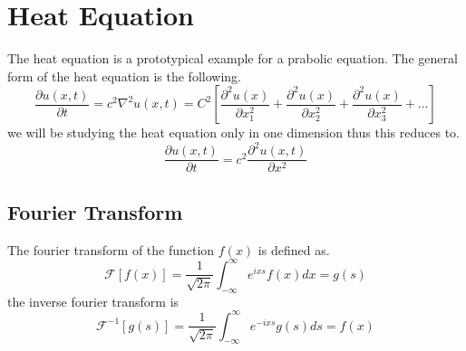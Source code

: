 \documentclass[]{article}
\begin{document}
\section{Heat Equation}
The heat equation is a prototypical example for a prabolic equation. The general form of the heat equation is the following.
\[
    \frac{\partial u(x,t)}{\partial t} = c^2\nabla^2 u(x,t) = C^2\left[\frac{\partial^2 u(x)}{\partial x^{2}_{1}} + \frac{\partial^2 u(x)}{\partial x^{2}_{2}} + \frac{\partial^2 u(x)}{\partial x^{2}_{3}} + \dots\right]    
\]
we will be studying the heat equation only in one dimension thus this reduces to.
\[
    \frac{\partial u(x,t)}{\partial t} = c^2 \frac{\partial^2 u(x,t)}{\partial x^2}     
\]


\subsection{Fourier Transform}

The fourier transform of the function $f(x)$ is defined as.
\[
    \mathscr{F}\left[f\left(x\right)\right]=\frac{1}{\sqrt{2\pi}}\int_{-\infty}^{\infty}e^{ixs}f\left(x\right)dx= g\left(s\right)    
\] 
the inverse fourier transform is 
\[
    \mathscr{F}^{-1}\left[g\left(s\right)\right]=\frac{1}{\sqrt{2\pi}}\int_{-\infty}^{\infty}e^{-ixs}g\left(s\right)ds= f\left(x\right)    
\]
\setcounter{equation}{0}
\end{document}
